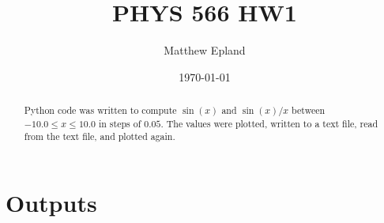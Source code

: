\documentclass[notitlepage,aps,prd,nofootinbib]{revtex4-1}
\begin{document}
\title{PHYS 566 HW1}
\author{Matthew Epland}

\date{\today}

\begin{abstract}
Python code was written to compute $\sin(x)$ and $\sin(x)/x$ between $-10.0 \le x \le 10.0$ in steps of $0.05$. The values were plotted, written to a text file, read from the text file, and plotted again.
\end{abstract}\maketitle

\section{Outputs}
\end{document}
